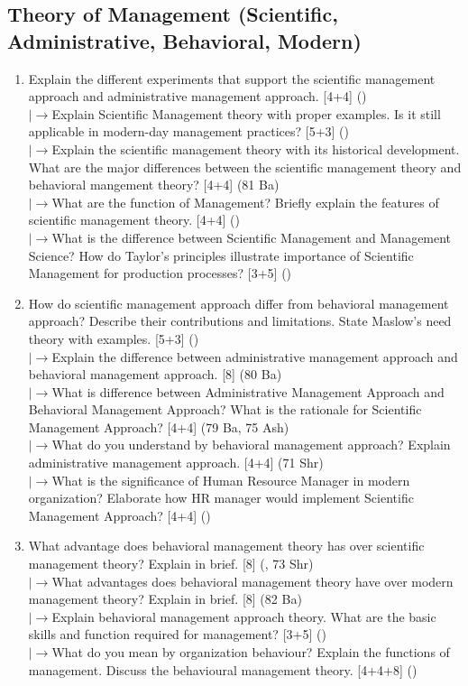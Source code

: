 \documentclass[12pt]{article}
\newcommand{\lb}{\\$\left|\rightarrow\right.$}
\begin{document}
  \subsection{Theory of Management (Scientific, Administrative, Behavioral, Modern)}
    \begin{enumerate}[topsep=0pt, noitemsep]
      \item Explain the different experiments that support the scientific management approach and administrative management approach. \hfill [4+4] ()
        \lb Explain Scientific Management theory with proper examples. Is it still applicable in modern-day management practices? \hfill [5+3] ()
        \lb Explain the scientific management theory with its historical development. What are the major differences between the scientific management theory and behavioral mangement theory? \hfill [4+4] (81 Ba)
        \lb What are the function of Management? Briefly explain the features of scientific management theory. \hfill [4+4] ()
        \lb What is the difference between Scientific Management and Management Science? How do Taylor's principles illustrate importance of Scientific Management for production processes? \hfill [3+5] ()

      \item How do scientific management approach differ from behavioral management approach? Describe their contributions and limitations. State Maslow's need theory with examples. \hfill [5+3] ()
        \lb Explain the difference between administrative management approach and behavioral management approach. \hfill [8] (80 Ba)
        \lb What is difference between Administrative Management Approach and Behavioral Management Approach? What is the rationale for Scientific Management Approach? \hfill [4+4] (79 Ba, 75 Ash)
        \lb What do you understand by behavioral management approach? Explain administrative management approach. \hfill [4+4] (71 Shr)
        \lb What is the significance of Human Resource Manager in modern organization? Elaborate how HR manager would implement Scientific Management Approach? \hfill [4+4] ()

      \item What advantage does behavioral management theory has over scientific management theory? Explain in brief. \hfill [8] (, 73 Shr)
        \lb What advantages does behavioral management theory have over modern management theory? Explain in brief. \hfill [8] (82 Ba)
        \lb Explain behavioral management approach theory. What are the basic skills and function required for management? \hfill [3+5] ()
        \lb What do you mean by organization behaviour? Explain the functions of management. Discuss the behavioural management theory. \hfill [4+4+8] ()


\end{enumerate}
\end{document}
